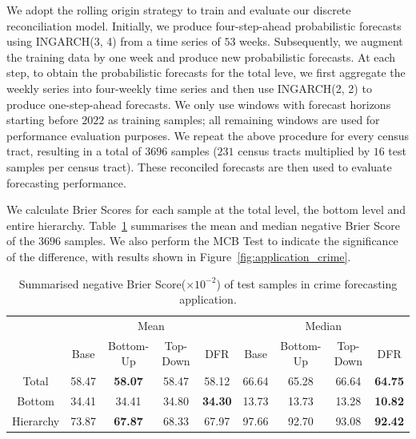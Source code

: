 \documentclass[a4paper,review,12pt,authoryear]{elsarticle}
\begin{document}
     We adopt the rolling origin strategy to train and evaluate our discrete reconciliation model. 
     Initially, we produce four-step-ahead probabilistic forecasts using INGARCH(3, 4) from a time series of $53$ weeks. 
     Subsequently, we augment the training data by one week and produce new probabilistic forecasts. 
     At each step, to obtain the probabilistic forecasts for the total leve, we first aggregate the weekly series into four-weekly time series and then use INGARCH(2, 2) to produce one-step-ahead forecasts.
     We only use windows with forecast horizons starting before $2022$ as training samples; all remaining windows are used for performance evaluation purposes.
     We repeat the above procedure for every census tract, resulting in a total of $3696$ samples ($231$ census tracts multiplied by $16$ test samples per census tract). 
     These reconciled forecasts are then used to evaluate forecasting performance. 
     
     We calculate Brier Scores for each sample at the total level, the bottom level and entire hierarchy. 
     Table~\ref{tab:crime_bs} summarises the mean and median negative Brier Score of the $3696$ samples.
     We also perform the MCB Test to indicate the significance of the difference, with results shown in Figure~\ref{fig:application_crime}.
     
     \begin{table}[h]
       \centering
       \caption{\label{tab:crime_bs}Summarised negative Brier Score($\times 10^{-2}$) of test samples in crime forecasting application.}
       \begin{tabular}{ccccccccc}
       \toprule
       &\multicolumn{4}{c}{Mean} 
       & \multicolumn{4}{c}{Median} \\ \cmidrule(lr){2-5} \cmidrule(lr){6-9}
        & Base & Bottom-Up & Top-Down & DFR &  Base & Bottom-Up & Top-Down & DFR \\\midrule
       Total & 58.47 & \textbf{58.07} & 58.47 & 58.12 & 66.64 & 65.28 & 66.64 & \textbf{64.75} \\
       Bottom & 34.41 & 34.41 & 34.80 & \textbf{34.30} & 13.73 & 13.73 & 13.28 & \textbf{10.82}\\
       Hierarchy & 73.87 & \textbf{67.87} & 68.33 & 67.97 & 97.66 & 92.70 & 93.08 & \textbf{92.42}\\
       \bottomrule
       \end{tabular}
       \end{table}
     
\end{document}
